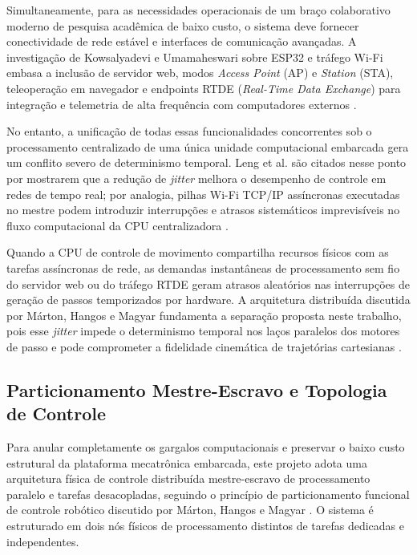 Simultaneamente, para as necessidades operacionais de um braço colaborativo moderno de pesquisa acadêmica de baixo custo, o sistema deve fornecer conectividade de rede estável e interfaces de comunicação avançadas. A investigação de Kowsalyadevi e Umamaheswari sobre ESP32 e tráfego Wi-Fi embasa a inclusão de servidor web, modos \textit{Access Point} (AP) e \textit{Station} (STA), teleoperação em navegador e endpoints RTDE (\textit{Real-Time Data Exchange}) para integração e telemetria de alta frequência com computadores externos \cite{kowsalyadevi2025comprehensive}.

No entanto, a unificação de todas essas funcionalidades concorrentes sob o processamento centralizado de uma única unidade computacional embarcada gera um conflito severo de determinismo temporal. Leng et al. são citados nesse ponto por mostrarem que a redução de \textit{jitter} melhora o desempenho de controle em redes de tempo real; por analogia, pilhas Wi-Fi TCP/IP assíncronas executadas no mestre podem introduzir interrupções e atrasos sistemáticos imprevisíveis no fluxo computacional da CPU centralizadora \cite{leng2014improving}. 

Quando a CPU de controle de movimento compartilha recursos físicos com as tarefas assíncronas de rede, as demandas instantâneas de processamento sem fio do servidor web ou do tráfego RTDE geram atrasos aleatórios nas interrupções de geração de passos temporizados por hardware. A arquitetura distribuída discutida por Márton, Hangos e Magyar fundamenta a separação proposta neste trabalho, pois esse \textit{jitter} impede o determinismo temporal nos laços paralelos dos motores de passo e pode comprometer a fidelidade cinemática de trajetórias cartesianas \cite{marton2009distributed}.

\subsection{Particionamento Mestre-Escravo e Topologia de Controle}
\label{subsec:particionamento_mestre_escravo}

Para anular completamente os gargalos computacionais e preservar o baixo custo estrutural da plataforma mecatrônica embarcada, este projeto adota uma arquitetura física de controle distribuída mestre-escravo de processamento paralelo e tarefas desacopladas, seguindo o princípio de particionamento funcional de controle robótico discutido por Márton, Hangos e Magyar \cite{marton2009distributed}. O sistema é estruturado em dois nós físicos de processamento distintos de tarefas dedicadas e independentes.

